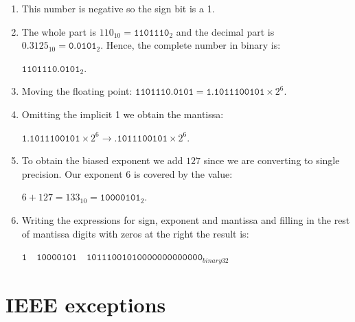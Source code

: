 \begin{enumerate}
    \item This number is negative so the sign bit is a 1.
    
    \item The whole part is $110_{10}=\texttt{1101110}_2$ and the decimal part is $0.3125_{10}=\texttt{0.0101}_2$. Hence, the complete number in binary is:
    
     $\texttt{1101110.0101}_2$. 
    
    \item Moving the floating point: $\texttt{1101110.0101}=\texttt{1.1011100101} \times 2^6$.
    
    \item Omitting the implicit 1 we obtain the mantissa: 
    
    $\texttt{1.1011100101}\times2^6 \rightarrow \texttt{.1011100101}\times2^6$.
    
    \item To obtain the biased exponent we add $127$ since we are converting to single precision. Our exponent $6$ is covered by the value:
    
     $6 + 127 = 133_{10}= \texttt{10000101}_2$. 
    
    \item Writing the expressions for sign, exponent and mantissa and filling in the rest of mantissa digits with zeros at the right the result is: 
    
    $\texttt{1}\quad \texttt{10000101}\quad \texttt{10111001010000000000000}_{binary32}$
    
\end{enumerate}





\section{IEEE exceptions}








